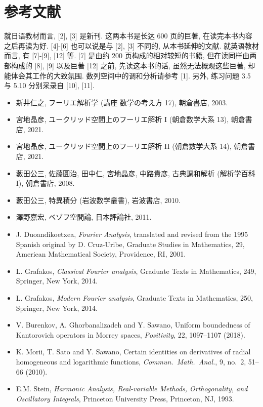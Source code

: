 
\chapter*{参考文献}

就日语教材而言, [2], [3] 是新刊. 这两本书是长达 600 页的巨著, 在读完本书内容之后再读为好. [4]-[6] 也可以说是与 [2], [3] 不同的, 从本书延伸的文献. 就英语教材而言, 有 [7]-[9], [12] 等. [7] 是由约 200 页构成的相对较短的书籍, 但在读同样由两部构成的 [8], [9] 以及巨著 [12] 之前, 先读这本书的话, 虽然无法概观这些巨著, 却能体会其工作的大致氛围. 数列空间中的调和分析请参考 [1]. 另外, 练习问题 3.5 与 5.10 分别采录自 [10], [11].

\begin{itemize}
\item[{[1]}] 新井仁之, フーリエ解析学 (講座 数学の考え方 17), 朝倉書店, 2003.
\item[{[2]}] 宮地晶彦, ユークリッド空間上のフーリエ解析 I (朝倉数学大系 13), 朝倉書店, 2021.
\item[{[3]}] 宮地晶彦, ユークリッド空間上のフーリエ解析 II (朝倉数学大系 14), 朝倉書店, 2021.
\item[{[4]}] 藪田公三, 佐藤圓治, 田中仁, 宮地晶彦, 中路貴彦, 古典調和解析 (解析学百科 I), 朝倉書店, 2008.
\item[{[5]}] 藪田公三, 特異積分 (岩波数学叢書), 岩波書店, 2010.
\item[{[6]}] 澤野嘉宏, ベゾフ空間論, 日本評論社, 2011.
\item[{[7]}] J. Duoandikoetxea, \emph{Fourier Analysis}, translated and revised from the 1995 Spanish original by D. Cruz-Uribe, Graduate Studies in Mathematics, 29, American Mathematical Society, Providence, RI, 2001.
\item[{[8]}] L. Grafakos, \emph{Classical Fourier analysis}, Graduate Texts in Mathematics, 249, Springer, New York, 2014.
\item[{[9]}] L. Grafakos, \emph{Modern Fourier analysis}, Graduate Texts in Mathematics, 250, Springer, New York, 2014.
\item[{[10]}] V. Burenkov, A. Ghorbanalizadeh and Y. Sawano, Uniform boundedness of Kantorovich operators in Morrey spaces, \emph{Positivity}, 22, 1097--1107 (2018).
\item[{[11]}] K. Morii, T. Sato and Y. Sawano, Certain identities on derivatives of radial homogeneous and logarithmic functions, \emph{Commun.\ Math.\ Anal.}, 9, no.\ 2, 51--66 (2010).
\item[{[12]}] E.M. Stein, \emph{Harmonic Analysis, Real-variable Methods, Orthogonality, and Oscillatory Integrals}, Princeton University Press, Princeton, NJ, 1993.
\end{itemize}

